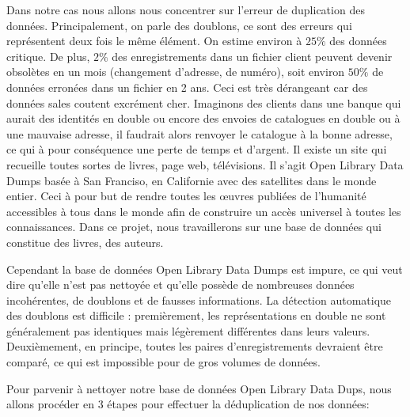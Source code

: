 \documentclass[12pt, a4paper]{article}
\begin{document}
Dans notre cas nous allons nous concentrer sur l'erreur de duplication des données.
Principalement, on parle des doublons, ce sont des erreurs qui représentent deux fois le même élément.  On estime environ à $ 25\% $  des données critique.  De plus, $ 2\% $ des enregistrements dans un fichier client peuvent devenir obsolètes en un mois (changement d’adresse, de numéro), soit environ $50\%$ de données erronées dans un fichier en 2 ans. Ceci est très dérangeant car des données sales coutent excrément cher.
Imaginons des clients dans une banque qui aurait des identités en double ou encore des envoies de catalogues en double ou à une mauvaise adresse, il faudrait alors renvoyer le catalogue à la bonne adresse, ce qui à pour conséquence une perte de temps et d'argent.
Il existe un site qui recueille toutes sortes de livres, page web, télévisions. Il s’agit Open Library Data Dumps basée à San Franciso, en Californie avec des satellites dans le monde entier.  Ceci à pour but de rendre toutes les œuvres publiées de l’humanité accessibles à tous dans le monde afin de construire un accès universel à toutes les connaissances.
Dans ce projet, nous travaillerons sur une base de données qui constitue des livres, des auteurs.



  


Cependant la base de données Open Library Data Dumps est impure, ce qui veut dire qu’elle n’est pas nettoyée et qu’elle possède de nombreuses données incohérentes, de doublons et de fausses informations.
La détection automatique des doublons est difficile : premièrement, les représentations en double ne sont généralement pas identiques mais légèrement différentes dans leurs valeurs. Deuxièmement, en principe, toutes les paires d'enregistrements devraient être comparé, ce qui est impossible pour de gros volumes de données.



Pour parvenir à nettoyer notre base de données Open Library Data Dups, nous allons procéder en 3 étapes pour effectuer la déduplication de nos données:
\end{document}
